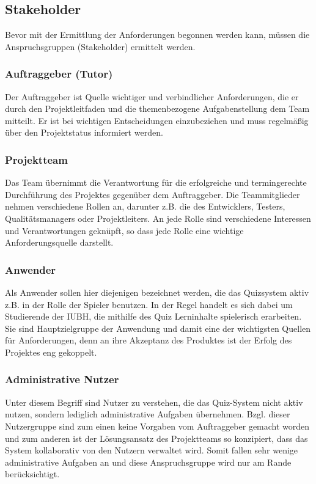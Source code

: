 \documentclass[a4paper,11pt,listof=numbered,glossary=totoc,parskip=half,toc=bib]{scrreprt}
\begin{document}
\subsection{Stakeholder}

Bevor mit der Ermittlung der Anforderungen begonnen werden kann, müssen die Anspruchsgruppen (Stakeholder) ermittelt werden.

\subsubsection{Auftraggeber (Tutor)}

Der Auftraggeber ist Quelle wichtiger und verbindlicher Anforderungen, die er durch den Projektleitfaden und die themenbezogene Aufgabenstellung dem Team mitteilt.
Er ist bei wichtigen Entscheidungen einzubeziehen und muss regelmäßig über den Projektstatus informiert werden.

\subsubsection{Projektteam}

Das Team übernimmt die Verantwortung für die erfolgreiche und termingerechte Durchführung des Projektes gegenüber dem Auftraggeber.
Die Teammitglieder nehmen verschiedene Rollen an, darunter z.B. die des Entwicklers, Testers, Qualitätsmanagers oder Projektleiters. 
An jede Rolle sind verschiedene Interessen und Verantwortungen geknüpft, so dass jede Rolle eine wichtige Anforderungsquelle darstellt.

\subsubsection{Anwender}

Als Anwender sollen hier diejenigen bezeichnet werden, die das Quizsystem aktiv z.B. in der Rolle der Spieler benutzen. In der Regel handelt es sich dabei um Studierende der IUBH, die mithilfe des Quiz Lerninhalte spielerisch erarbeiten. 
Sie sind Hauptzielgruppe der Anwendung und damit eine der wichtigsten Quellen für Anforderungen, denn an ihre Akzeptanz des Produktes ist der Erfolg des Projektes eng gekoppelt. 

\subsubsection{Administrative Nutzer}

Unter diesem Begriff sind Nutzer zu verstehen, die das Quiz-System nicht aktiv nutzen, sondern lediglich administrative Aufgaben übernehmen.
Bzgl. dieser Nutzergruppe sind zum einen keine Vorgaben vom Auftraggeber gemacht worden und zum anderen ist der Lösungsansatz des Projektteams so konzipiert, dass das System kollaborativ von den Nutzern verwaltet wird. 
Somit fallen sehr wenige administrative Aufgaben an und diese Anspruchsgruppe wird nur am Rande berücksichtigt.
\end{document}
